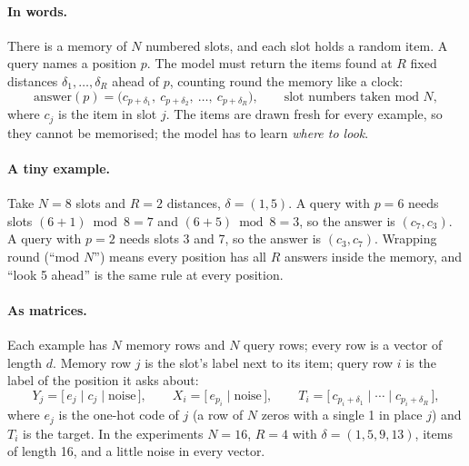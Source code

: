 \documentclass[11pt]{article}
\begin{document}
\paragraph{In words.} There is a memory of $N$ numbered slots, and each slot holds a random item.
A query names a position $p$. The model must return the items found at $R$ fixed distances
$\delta_1, \dots, \delta_R$ ahead of $p$, counting round the memory like a clock:
\begin{equation}
\text{answer}(p) = \big(c_{p+\delta_1},\ c_{p+\delta_2},\ \dots,\ c_{p+\delta_R}\big),
\qquad \text{slot numbers taken mod } N,
\label{eq:task}
\end{equation}
where $c_j$ is the item in slot $j$. The items are drawn fresh for every example, so they cannot
be memorised; the model has to learn \emph{where to look}.

\paragraph{A tiny example.} Take $N = 8$ slots and $R = 2$ distances, $\delta = (1, 5)$. A query
with $p = 6$ needs slots $(6 + 1) \bmod 8 = 7$ and $(6 + 5) \bmod 8 = 3$, so the answer is
$(c_7, c_3)$. A query with $p = 2$ needs slots 3 and 7, so the answer is $(c_3, c_7)$. Wrapping
round (``mod $N$'') means every position has all $R$ answers inside the memory, and ``look 5
ahead'' is the same rule at every position.

\paragraph{As matrices.} Each example has $N$ memory rows and $N$ query rows; every row is a vector
of length $d$. Memory row $j$ is the slot's label next to its item; query row $i$ is the label of
the position it asks about:
\[
Y_j = \big[\, e_j \;\big|\; c_j \;\big|\; \text{noise} \,\big], \qquad
X_i = \big[\, e_{p_i} \;\big|\; \text{noise} \,\big], \qquad
T_i = \big[\, c_{p_i+\delta_1} \;\big|\; \cdots \;\big|\; c_{p_i+\delta_R} \,\big],
\]
where $e_j$ is the one-hot code of $j$ (a row of $N$ zeros with a single 1 in place $j$) and $T_i$
is the target. In the experiments $N = 16$, $R = 4$ with $\delta = (1, 5, 9, 13)$, items of length
16, and a little noise in every vector.
\end{document}
